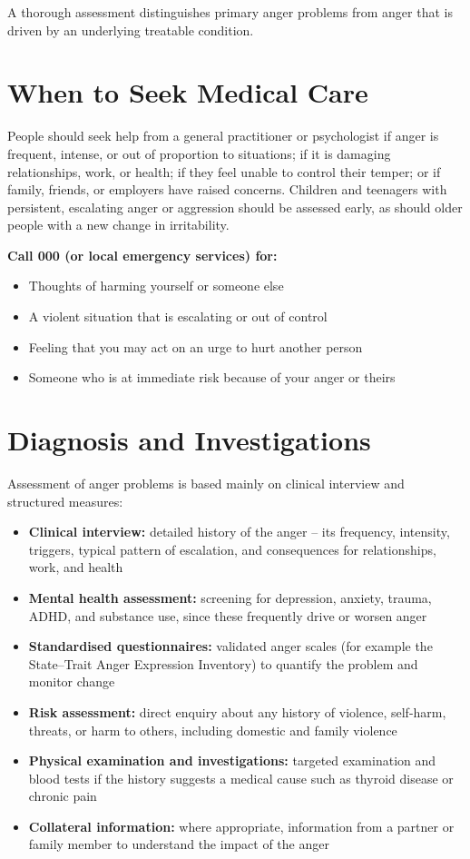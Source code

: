 A thorough assessment distinguishes primary anger problems from anger that is driven by an underlying treatable condition.

\section*{When to Seek Medical Care}
People should seek help from a general practitioner or psychologist if anger is frequent, intense, or out of proportion to situations; if it is damaging relationships, work, or health; if they feel unable to control their temper; or if family, friends, or employers have raised concerns. Children and teenagers with persistent, escalating anger or aggression should be assessed early, as should older people with a new change in irritability.

\textbf{Call 000 (or local emergency services) for:}
\begin{itemize}
    \item Thoughts of harming yourself or someone else
    \item A violent situation that is escalating or out of control
    \item Feeling that you may act on an urge to hurt another person
    \item Someone who is at immediate risk because of your anger or theirs
\end{itemize}

\section*{Diagnosis and Investigations}
Assessment of anger problems is based mainly on clinical interview and structured measures:

\begin{itemize}
    \item \textbf{Clinical interview:} detailed history of the anger -- its frequency, intensity, triggers, typical pattern of escalation, and consequences for relationships, work, and health
    \item \textbf{Mental health assessment:} screening for depression, anxiety, trauma, ADHD, and substance use, since these frequently drive or worsen anger
    \item \textbf{Standardised questionnaires:} validated anger scales (for example the State--Trait Anger Expression Inventory) to quantify the problem and monitor change
    \item \textbf{Risk assessment:} direct enquiry about any history of violence, self-harm, threats, or harm to others, including domestic and family violence
    \item \textbf{Physical examination and investigations:} targeted examination and blood tests if the history suggests a medical cause such as thyroid disease or chronic pain
    \item \textbf{Collateral information:} where appropriate, information from a partner or family member to understand the impact of the anger
\end{itemize}

